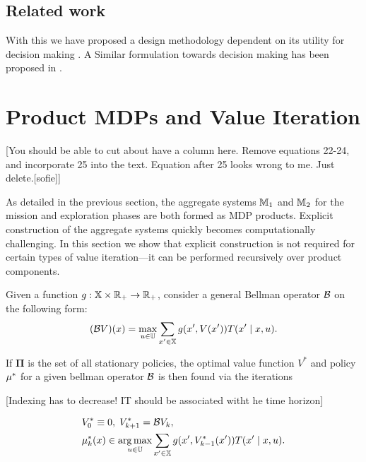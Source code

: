 \documentclass[conference]{IEEEtran}
\renewcommand{\cite}[1]{\citep{#1}}
\newcommand{\red}[1]{{\color{red} #1 }}
\newcommand{\sofieNew}[1]{{\color{blue}#1}}
\begin{document}
\subsection{Related work}
\sofieNew{With this we have proposed a design methodology dependent on  its utility for decision making \cite{lindley2000philosophy}. A Similar formulation towards decision making   has been proposed in \cite{haesaert2016experiment}.}

\section{Product MDPs and Value Iteration}
\label{sec:valueiter}


\red{[You should be able to cut about have a column here. Remove equations 22-24, and incorporate 25 into the text. Equation after 25 looks wrong to me. Just delete.[sofie]]}

As detailed in the previous section, the aggregate systems $\mathbb{M}_1$ and $\mathbb{M}_2$ for the mission and exploration phases are both formed as MDP products. Explicit construction of the aggregate systems quickly becomes computationally challenging. In this section we show that explicit construction is not required for certain types of value iteration---it can be performed recursively over product components.

Given a function $g: \mathbb{X} \times \mathbb{R}_+ \rightarrow \mathbb{R}_+$, consider a general Bellman operator $\mathcal{B}$ on the following form:
\begin{equation}
  (\mathcal{B} V) (x) = \max_{u \in \mathbb{U}} \sum_{x' \in \mathbb{X}} g(x', V(x')) T(x' \mid x, u).
\end{equation}

If $\mathbf{\Pi}$ is the set of all stationary policies, the optimal value function $V^*$ and policy $\mu^*$ for a given bellman operator $\mathcal{B}$ is then found via the iterations

\red{[Indexing has to decrease! IT should be associated witht he time horizon]}

\begin{subequations}
\label{eq:value_iter}
  \begin{align}
    & V^*_0 \equiv 0, \; V^*_{k+1}  = \bellman V_k \label{eq:iter}, \\
    & \pol_k^*(x) \in \argmax_{u \in \U} \sum_{x' \in \X}  g(x', V_{k-1}^*(x')) T(x' \mid x, u).
  \end{align}
\end{subequations}
\end{document}
